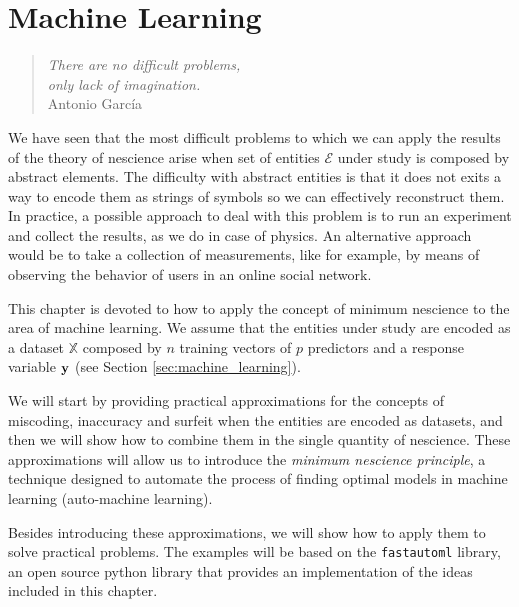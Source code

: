 %
%


\chapter{Machine Learning}
\label{chap:Machine-Learning}

\begin{quote}
\begin{flushright}
\emph{There are no difficult problems,\\
only lack of imagination.}\\
Antonio García \\
\end{flushright}
\end{quote}
\bigskip

We have seen that the most difficult problems to which we can apply the results of the theory of nescience arise when set of entities $\mathcal{E}$ under study is composed by abstract elements. The difficulty with abstract entities is that it does not exits a way to encode them as strings of symbols so we can effectively reconstruct them. In practice, a possible approach to deal with this problem is to run an experiment and collect the results, as we do in case of physics. An alternative approach would be to take a collection of measurements, like for example, by means of observing the behavior of users in an online social network.

This chapter is devoted to how to apply the concept of minimum nescience to the area of machine learning. We assume that the entities under study are encoded as a dataset $\mathbb{X}$ composed by $n$ training vectors of $p$ predictors and a response variable $\bold{y}$ (see Section \ref{sec:machine_learning}).

We will start by providing practical approximations for the concepts of miscoding, inaccuracy and surfeit when the entities are encoded as datasets, and then we will show how to combine them in the single quantity of nescience. These approximations will allow us to introduce the \emph{minimum nescience principle}, a technique designed to automate the process of finding optimal models in machine learning (auto-machine learning). 

Besides introducing these approximations, we will show how to apply them to solve practical problems. The examples will be based on the \texttt{fastautoml} library, an open source python library that provides an implementation of the ideas included in this chapter.

